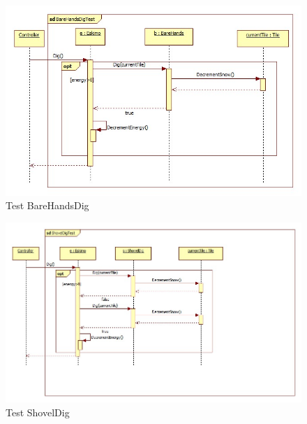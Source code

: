 \begin{figure}[H]
	\begin{center}
		\includegraphics[width=15cm]{chapters/chapter05/diagrams/TestBareHandsDig.jpg}
		\caption{Test BareHandsDig}
		\label{fig:Test BareHandsDig}
	\end{center}
\end{figure}

\begin{figure}[H]
	\begin{center}
		\includegraphics[width=17cm]{chapters/chapter05/diagrams/TestShovelDig.jpg}
		\caption{Test ShovelDig}
		\label{fig:Test ShovelDig}
	\end{center}
\end{figure}


